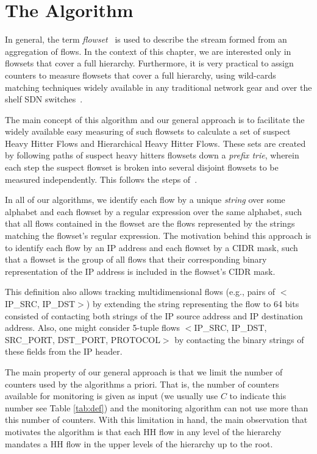 \section{The \simpleAlgo Algorithm}

In general, the term \textit{flowset}~\cite{conf/sigcomm/YuanCM07} is used to describe the stream formed from an aggregation of flows.
In the context of this chapter, we are interested only in flowsets that cover a full hierarchy.
Furthermore, it is very practical to assign counters to measure flowsets that cover a full hierarchy, using wild-cards matching techniques widely available in any traditional network gear and over the shelf SDN switches~\cite{OVS, OF1.5}.



The main concept of this algorithm and our general approach is to facilitate the widely available easy measuring of such flowsets to calculate a set of suspect Heavy Hitter Flows and Hierarchical Heavy Hitter Flows. These sets are created by following paths of suspect heavy hitters flowsets down a \textit{prefix trie}, wherein each step the suspect flowset is broken into several disjoint flowsets to be measured independently. This follows the steps of~\cite{conf/sigcomm/YuanCM07,Moraney2016}.

In all of our algorithms, we identify each flow by a unique \textit{string} over some alphabet and each flowset by a regular expression over the same alphabet, such that all flows contained in the flowset are the flows represented by the strings matching the flowset's regular expression. The motivation behind this approach is to identify each flow by an IP address and each flowset by a CIDR mask, such that a flowset is the group of all flows that their corresponding binary representation of the IP address is included in the flowset's CIDR mask.

This definition also allows tracking multidimensional flows (e.g., pairs of $<$IP\_SRC, IP\_DST$>$) by extending the string representing the flow to 64 bits consisted of contacting both strings of the IP source address and IP destination address. Also, one might consider 5-tuple flows $<$IP\_SRC, IP\_DST, SRC\_PORT, DST\_PORT, PROTOCOL$>$ by contacting the binary strings of these fields from the IP header.

The main property of our general approach is that we limit the number of counters used by the algorithms a priori. That is, the number of counters available for monitoring is given as input (we usually use $C$ to indicate this number see Table \ref{tab:def}) and the monitoring algorithm can not use more than this number of counters.
With this limitation in hand, the main observation that motivates the algorithm is that each HH flow in any level of the hierarchy mandates a HH flow in the upper levels of the hierarchy up to the root.

